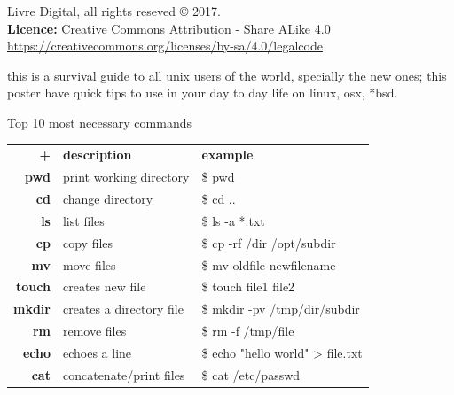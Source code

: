 \documentclass{beamer}
\begin{document}
\begin{frame}[t]
{\begin{minipage}{.50\linewidth}
        \vspace{20pt}
        \titlepage
    \end{minipage}
    \begin{minipage}[t]{.055\linewidth}
        \hspace{\fill}
    \end{minipage}
    \begin{minipage}{.20\linewidth}
        Livre Digital, all rights reseved \copyright{} 2017.\\
  \textbf{Licence:} Creative Commons Attribution - Share ALike 4.0\\
  \small{\url{https://creativecommons.org/licenses/by-sa/4.0/legalcode}}
    \end{minipage}
    
    \vspace{20pt}
    
    \begin{center}
    this is a survival guide to all unix users of the world, specially the new ones; this poster have quick tips to use in your day to day life on linux, osx, *bsd.
    \end{center}
    
    \vspace{10pt}
    \hline
    \vspace{10pt}
    
    \begin{minipage}[t]{.25\linewidth}
        \begin{exampleblock}{Top 10 most necessary commands}
        \centering
        \parbox{.95\textwidth}{
        \begin{tabular}{r p{} p{} }
            \textbf{+} & \textbf{\large description} & \textbf{\large example}\\
            \textbf{pwd} & print working directory & \$ pwd\\
            \textbf{cd} & change directory & \$ cd ..\\
            \textbf{ls} & list files & \$ ls -a *.txt\\
            \textbf{cp} & copy files & \$ cp -rf /dir /opt/subdir\\
            \textbf{mv} & move files & \$ mv oldfile newfilename \\
            \textbf{touch} & creates new file & \$ touch file1 file2\\
            \textbf{mkdir} & creates a directory file & \$ mkdir -pv /tmp/dir/subdir\\
            \textbf{rm} & remove files & \$ rm -f /tmp/file\\
            \textbf{echo} & echoes a line & \$ echo "hello world" \textgreater{} file.txt\\
            \textbf{cat} & concatenate/print files & \$ cat /etc/passwd\\
        \end{tabular}
        \vspace{20pt}
        }
        \end{exampleblock}
        

\end{minipage}}
\end{frame}
\end{document}
